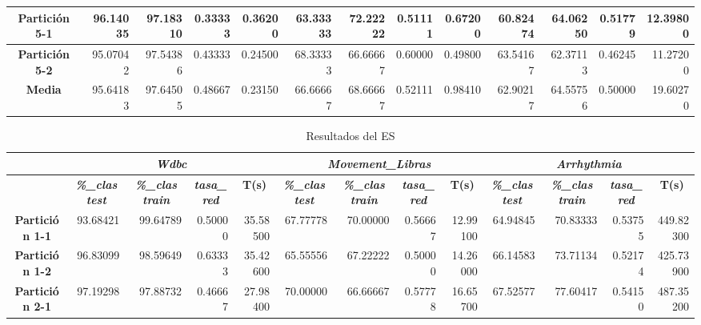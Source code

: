 \documentclass[a4paper,11pt]{article}
\begin{document}
\begin{table}[H]
\begin{adjustbox}{width=1.1\textwidth}
\begin{tabular}{|c|r|r|r|r|r|r|r|r|r|r|r|r|}
    \textbf{Partición 5-1} & 96.14035 & 97.18310 & 0.33333 & 0.36200 & 63.33333 & 72.22222 & 0.51111 & 0.67200 & 60.82474 & 64.06250 & 0.51779 & 12.39800 \\ \hline
    \textbf{Partición 5-2} & 95.07042 & 97.54386 & 0.43333 & 0.24500 & 68.33333 & 66.66667 & 0.60000 & 0.49800 & 63.54167 & 62.37113 & 0.46245 & 11.27200 \\ \hline
    \textbf{Media} & 95.64183 & 97.64505 & 0.48667 & 0.23150 & 66.66667 & 68.66667 & 0.52111 & 0.98410 & 62.90217 & 64.55756 & 0.50000 & 19.60270 \\ \hline
    \end{tabular}
    \end{adjustbox}
    \label{BL}
  \end{table}  

    
   \begin{table}[H]	
    \caption*{Resultados del ES}
    \begin{adjustbox}{width=1.1\textwidth}
    \begin{tabular}{|c|r|r|r|r|r|r|r|r|r|r|r|r|}
    \hline
    \multicolumn{1}{|l|}{} & \multicolumn{ 4}{c|}{\textbf{\textit{Wdbc}}} & \multicolumn{ 4}{c|}{\textbf{\textit{Movement\_Libras}}} & \multicolumn{ 4}{c|}{\textbf{\textit{Arrhythmia}}} \\ \hline
    & \multicolumn{1}{c|}{\textbf{\textit{\%\_clas test}}} & \multicolumn{1}{c|}{\textbf{\textit{\%\_clas train}}} & \multicolumn{1}{c|}{\textbf{\textit{tasa\_red}}} & \multicolumn{1}{c|}{\textbf{T(s)}} & \multicolumn{1}{c|}{\textbf{\textit{\%\_clas test}}} & \multicolumn{1}{c|}{\textbf{\textit{\%\_clas train}}} & \multicolumn{1}{c|}{\textbf{\textit{tasa\_red}}} & \multicolumn{1}{c|}{\textbf{T(s)}} & \multicolumn{1}{c|}{\textbf{\textit{\%\_clas test}}} & \multicolumn{1}{c|}{\textbf{\textit{\%\_clas train}}} & \multicolumn{1}{c|}{\textbf{\textit{tasa\_red}}} & \multicolumn{1}{c|}{\textbf{T(s)}} \\ \hline
    \textbf{Partición 1-1} & 93.68421 & 99.64789 & 0.50000 & 35.58500 & 67.77778 & 70.00000 & 0.56667 & 12.99100 & 64.94845 & 70.83333 & 0.53755 & 449.82300 \\ \hline
    \textbf{Partición 1-2} & 96.83099 & 98.59649 & 0.63333 & 35.42600 & 65.55556 & 67.22222 & 0.50000 & 14.26000 & 66.14583 & 73.71134 & 0.52174 & 425.73900 \\ \hline
    \textbf{Partición 2-1} & 97.19298 & 97.88732 & 0.46667 & 27.98400 & 70.00000 & 66.66667 & 0.57778 & 16.65700 & 67.52577 & 77.60417 & 0.54150 & 487.35200 \\ \hline

\end{tabular}
\end{adjustbox}
\end{table}
\end{document}
